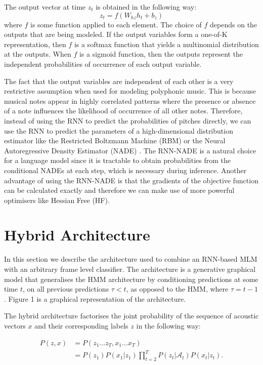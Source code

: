 \documentclass{article}
\begin{document}
The output vector at time $z_t$ is obtained in the following way:
\begin{equation}
 z_t = f(W_{hz}h_t + b_z)
\end{equation} where $f$ is some function applied to each element. The choice of $f$ depends on the outputs that are being modeled. If the output variables form a one-of-K representation, then $f$ is a softmax function that yields a multinomial distribution at the outputs. When $f$ is a sigmoid function, then the outputs represent the independent probabilities of occurrence of each output variable. 

The fact that the output variables are independent of each other is a very restrictive assumption when used for modeling polyphonic music. This is because musical notes appear in highly correlated patterns where the presence or absence of a note influences the likelihood of occurrence of all other notes. Therefore, instead of using the RNN to predict the probabilities of pitches directly, we can use the RNN to predict the parameters of a high-dimensional distribution estimator like the Restricted Boltzmann Machine (RBM) or the Neural Autoregressive Density Estimator (NADE) \cite{boulanger2012modeling}. The RNN-NADE is a natural choice for a language model since it is tractable to obtain probabilities from the conditional NADEs at each step, which is necessary during inference. Another advantage of using the RNN-NADE is that the gradients of the objective function can be calculated exactly and therefore we can make use of more powerful optimisers like Hessian Free (HF).  


\section{Hybrid Architecture}

In this section we describe the architecture used to combine an RNN-based MLM with an arbitrary frame level classifier. The architecture is a generative graphical model that generalises the HMM architecture by conditioning predictions at some time $t$, on all previous predictions $\tau < t$, as opposed to the HMM, where $\tau = t-1$. Figure 1 is a graphical representation of the architecture. 


The hybrid architecture factorises the joint probability of the sequence of acoustic vectors $x$ and their corresponding labels $z$ in the following way:

\begin{align}
 P(z,x) &= P(z_{1} \ldots z_{T} , x_{1} \ldots x_{T}) \\ 
  &= P(z_1)P(x_{1}|z_1) \prod_{t=2}^{T} P(z_t|\mathcal{A}_t) P(x_t|z_t). \\ \nonumber
\end{align}
\end{document}
